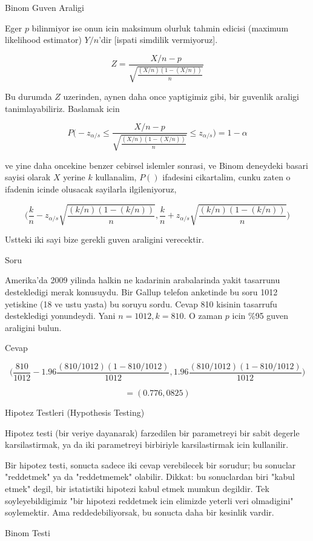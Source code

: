 \documentclass[12pt,fleqn]{article}\usepackage{../common}
\begin{document}
Binom Guven Araligi

Eger $p$ bilinmiyor ise onun icin maksimum olurluk tahmin edicisi (maximum
likelihood estimator) $Y/n$'dir [ispati simdilik vermiyoruz]. 

$$Z  = \frac{X/n - p}{\sqrt{\frac{(X/n)(1-(X/n))}{n}}}$$

Bu durumda $Z$ uzerinden, aynen daha once yaptigimiz gibi, bir guvenlik
araligi tanimlayabiliriz. Baslamak icin 

$$ 
P \bigg( 
-z_{\alpha/s} \le
\frac{X/n - p}{\sqrt{\frac{(X/n)(1-(X/n))}{n}}} \le 
z_{\alpha/s}
\bigg) =
1-\alpha
$$

ve yine daha oncekine benzer cebirsel islemler sonrasi, ve Binom deneydeki
basari sayisi olarak $X$ yerine $k$ kullanalim, $P()$ ifadesini cikartalim,
cunku zaten o ifadenin icinde olusacak sayilarla ilgileniyoruz,

$$ 
\bigg( 
\frac{k}{n}-
z_{\alpha/s}\sqrt{\frac{(k/n)(1-(k/n))}{n}}
,
\frac{k}{n} +
z_{\alpha/s} \sqrt{\frac{(k/n)(1-(k/n))}{n}}
\bigg)
$$

Ustteki iki sayi bize gerekli guven araligini verecektir. 

Soru 

Amerika'da 2009 yilinda halkin ne kadarinin arabalarinda yakit tasarrunu
destekledigi merak konusuydu. Bir Gallup telefon anketinde bu soru 1012
yetiskine (18 ve ustu yasta) bu soruyu sordu. Cevap 810 kisinin tasarrufu
destekledigi yonundeydi. Yani $n=1012,k=810$. O zaman $p$ icin \%95 guven
araligini bulun.

Cevap 

$$ \bigg(
\frac{810}{1012}-1.96 \frac{(810/1012)(1-810/1012)}{1012} ,
1.96 \frac{(810/1012)(1-810/1012)}{1012}
\bigg)
$$

$$ = (0.776,0825) $$

Hipotez Testleri (Hypothesis Testing)

Hipotez testi (bir veriye dayanarak) farzedilen bir parametreyi bir
sabit degerle karsilastirmak, ya da iki parametreyi birbiriyle
karsilastirmak icin kullanilir. 

Bir hipotez testi, sonucta sadece iki cevap verebilecek bir sorudur;
bu sonuclar "reddetmek" ya da "reddetmemek" olabilir. Dikkat: bu
sonuclardan biri "kabul etmek" degil, bir istatistiki hipotezi kabul
etmek mumkun degildir. Tek soyleyebildigimiz "bir hipotezi reddetmek
icin elimizde yeterli veri olmadigini" soylemektir. Ama
reddedebiliyorsak, bu sonucta daha bir kesinlik vardir. 

Binom Testi
\end{document}
